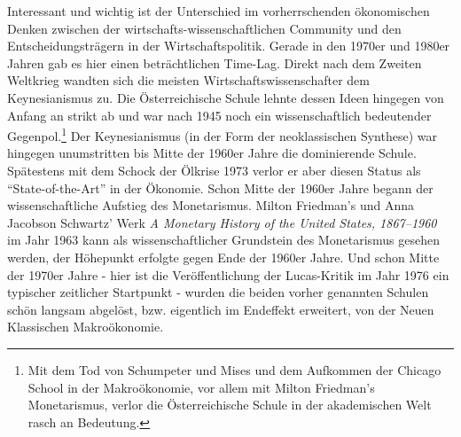 Interessant und wichtig ist der Unterschied im vorherrschenden ökonomischen Denken zwischen der wirtschafts-wissenschaftlichen Community und den Entscheidungsträgern in der Wirtschaftspolitik. Gerade in den 1970er und 1980er Jahren gab es hier einen beträchtlichen Time-Lag. Direkt nach dem Zweiten Weltkrieg wandten sich die meisten Wirtschaftswissenschafter dem Keynesianismus zu. Die Österreichische Schule lehnte dessen Ideen hingegen von Anfang an strikt ab und war nach 1945 noch ein wissenschaftlich bedeutender Gegenpol.\footnote{Mit dem Tod von Schumpeter und Mises und dem Aufkommen der Chicago School in der Makroökonomie, vor allem mit Milton Friedman's Monetarismus, verlor die Österreichische Schule in der akademischen Welt rasch an Bedeutung.} Der Keynesianismus (in der Form der neoklassischen Synthese) war hingegen unumstritten bis Mitte der 1960er Jahre die dominierende Schule. Spätestens mit dem Schock der Ölkrise 1973 verlor er aber diesen Status als "`State-of-the-Art"' in der Ökonomie. 
Schon Mitte der 1960er Jahre begann der wissenschaftliche Aufstieg des Monetarismus. Milton Friedman's und Anna Jacobson Schwartz' Werk \textit{A Monetary History of the United States, 1867–1960} im Jahr 1963 kann als wissenschaftlicher Grundstein des Monetarismus gesehen werden, der Höhepunkt erfolgte gegen Ende der 1960er Jahre. Und schon Mitte der 1970er Jahre - hier ist die Veröffentlichung der Lucas-Kritik im Jahr 1976 ein typischer zeitlicher Startpunkt - wurden die beiden vorher genannten Schulen schön langsam abgelöst, bzw. eigentlich im Endeffekt erweitert, von der Neuen Klassischen Makroökonomie.

